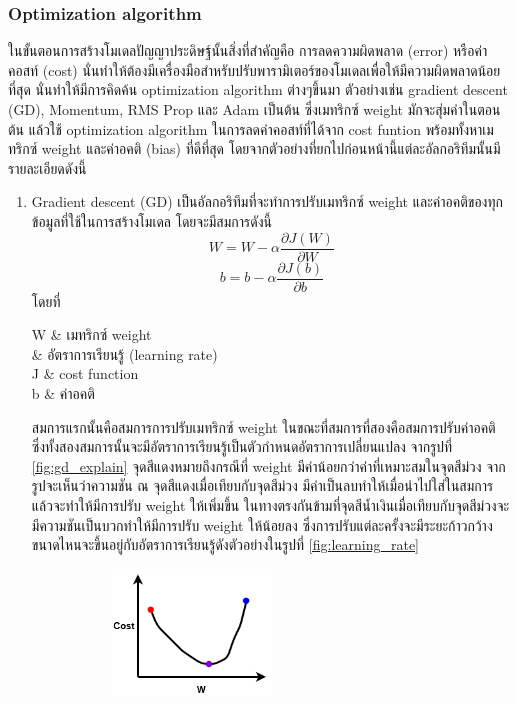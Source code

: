 \subsubsection{Optimization algorithm}
ในขั้นตอนการสร้างโมเดลปัญญาประดิษฐ์นั้นสิ่งที่สำคัญคือ การลดความผิดพลาด (error) หรือค่าคอสท์ (cost) นั่นทำให้ต้องมีเครื่องมือสำหรับปรับพารามิเตอร์ของโมเดลเพื่อให้มีความผิดพลาดน้อยที่สุด
นั่นทำให้มีการคิดค้น optimization algorithm ต่างๆขึ้นมา ตัวอย่างเช่น gradient descent (GD), Momentum, RMS Prop และ Adam เป็นต้น
ซึ่งเมทริกซ์ weight มักจะสุ่มค่าในตอนต้น แล้วใช้ optimization algorithm ในการลดค่าคอสท์ที่ได้จาก cost funtion พร้อมทั้งหาเมทริกซ์ weight และค่าอคติ (bias) ที่ดีที่สุด
โดยจากตัวอย่างที่ยกไปก่อนหน้านี้แต่ละอัลกอริทึมนั้นมีรายละเอียดดังนี้
\begin{enumerate}
	\item Gradient descent (GD) เป็นอัลกอริทึมที่จะทำการปรับเมทริกซ์ weight และค่าอคติของทุกข้อมูลที่ใช้ในการสร้างโมเดล โดยจะมีสมการดังนี้
	\begin{equation}
		W = W - \alpha \frac{\partial J(W)}{\partial W}
	\end{equation}
	\begin{equation}
		b = b - \alpha \frac{\partial J(b)}{\partial b}
	\end{equation}
	โดยที่
	\begin{conditions}
		W & เมทริกซ์ weight\\
		\alpha & อัตราการเรียนรู้ (learning rate)\\
		J & cost function\\
		b & ค่าอคติ
	\end{conditions}
	สมการแรกนั้นคือสมการการปรับเมทริกซ์ weight ในขณะที่สมการที่สองคือสมการปรับค่าอคติ ซึ่งทั้งสองสมการนั้นจะมีอัตราการเรียนรู้เป็นตัวกำหนดอัตราการเปลี่ยนแปลง จากรูปที่ \ref{fig:gd_explain} จุดสีแดงหมายถึงกรณีที่ weight มีค่าน้อยกว่าค่าที่เหมาะสมในจุดสีม่วง จากรูปจะเห็นว่าความชัน ณ จุดสีแดงเมื่อเทียบกับจุดสีม่วง มีค่าเป็นลบทำให้เมื่อนำไปใส่ในสมการแล้วจะทำให้มีการปรับ weight ให้เพิ่มขึ้น ในทางตรงกันข้ามที่จุดสีน้ำเงินเมื่อเทียบกับจุดสีม่วงจะมีความชันเป็นบวกทำให้มีการปรับ weight ให้น้อยลง  ซึ่งการปรับแต่ละครั้งจะมีระยะก้าวกว้างขนาดไหนจะขึ้นอยู่กับอัตราการเรียนรู้ดังตัวอย่างในรูปที่ \ref{fig:learning_rate}
	\begin{figure}
		\begin{subfigure}[!ht]{0.5\textwidth}
			\centering
			\includegraphics[width=0.5\textwidth]{chapter2/images/gd_explain.png}

\end{subfigure}
\end{figure}
\end{enumerate}
